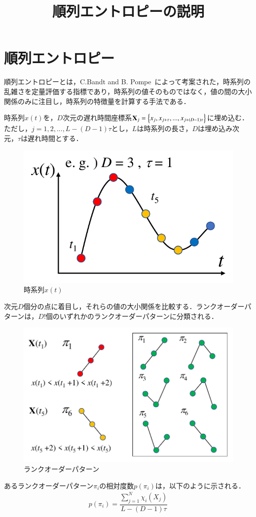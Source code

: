 \documentclass[autodetect-engine,dvipdfmx-if-dvi,ja=standard,a4paper,11pt]{bxjsarticle} %
\title{順列エントロピーの説明} %
\begin{document}
\maketitle %
\section{順列エントロピー}
順列エントロピーとは，C.Bandt and  B. Pompe~\cite{PE2002}によって考案された，時系列の乱雑さを定量評価する指標であり，時系列の値そのものではなく，値の間の大小関係のみに注目し，時系列の特徴量を計算する手法である．
\par 時系列$ x(t) $を，$ D $次元の遅れ時間座標系$\bm{{\rm X}} _j=\left\{x_j, x_{j+\tau},...,x_{j+(D-1)\tau}\right\} $に埋め込む．ただし，$j=1,2,...,L-(D-1) \tau$とし，$L$は時系列の長さ，$D$は埋め込み次元，$\tau$は遅れ時間とする．
\begin{figure}[H]
\begin{center}
\includegraphics[width=.4\textwidth]{crop_PE1ver2.pdf} 
\end{center}
\caption{時系列$ x(t) $}%
\label{PE1}
\end{figure}
次元$ D $個分の点に着目し，それらの値の大小関係を比較する．ランクオーダーパターンは，$D!$個のいずれかのランクオーダーパターンに分類される．
\begin{figure}[H]
\begin{center}
\includegraphics[width=.55\textwidth]{crop_PE2.pdf} 
\end{center}
\caption{ランクオーダーパターン}%
\label{PE21}
\end{figure}
あるランクオーダーパターン$\pi_i$の相対度数$p(\pi_i)$は，以下のように示される．
\begin{eqnarray}
p(\pi_i)=\dfrac{\sum_{j=1}^{N} \chi_{i}(X_{j})}{L-(D-1)\tau}
\end{eqnarray}
\end{document}
